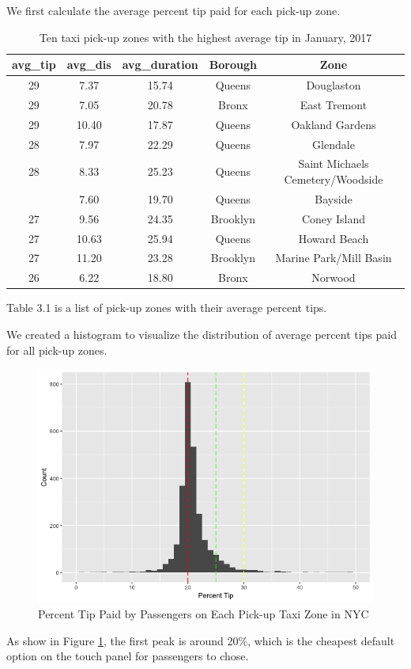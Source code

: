\documentclass[12pt,twoside]{reedthesis}
\theoremstyle{definition}
\theoremstyle{definition}
\theoremstyle{definition}
\theoremstyle{remark}
\begin{document}
We first calculate the average percent tip paid for each pick-up zone.
\begin{table}

\caption{\label{tab:unnamed-chunk-40}Ten taxi pick-up zones with the highest average tip in January, 2017}
\centering
\begin{tabular}[t]{ccccc}
\toprule
avg\_tip & avg\_dis & avg\_duration & Borough & Zone\\
\midrule
29 & 7.37 & 15.74 & Queens & Douglaston\\
29 & 7.05 & 20.78 & Bronx & East Tremont\\
29 & 10.40 & 17.87 & Queens & Oakland Gardens\\
28 & 7.97 & 22.29 & Queens & Glendale\\
28 & 8.33 & 25.23 & Queens & Saint Michaels Cemetery/Woodside\\
\addlinespace
27 & 7.60 & 19.70 & Queens & Bayside\\
27 & 9.56 & 24.35 & Brooklyn & Coney Island\\
27 & 10.63 & 25.94 & Queens & Howard Beach\\
27 & 11.20 & 23.28 & Brooklyn & Marine Park/Mill Basin\\
26 & 6.22 & 18.80 & Bronx & Norwood\\
\bottomrule
\end{tabular}
\end{table}
Table 3.1 is a list of pick-up zones with their average percent tips.

We created a histogram to visualize the distribution of average percent
tips paid for all pick-up zones.
\begin{figure}

{\centering \includegraphics[width=4.77in]{figure/pickup_vis} 

}

\caption{Percent Tip Paid by Passengers on Each Pick-up Taxi Zone in NYC}\label{fig:pickup-vis}
\end{figure}
As show in Figure \ref{fig:pickup-vis}, the first peak is around 20\%,
which is the cheapest default option on the touch panel for passengers
to chose.
\end{document}
